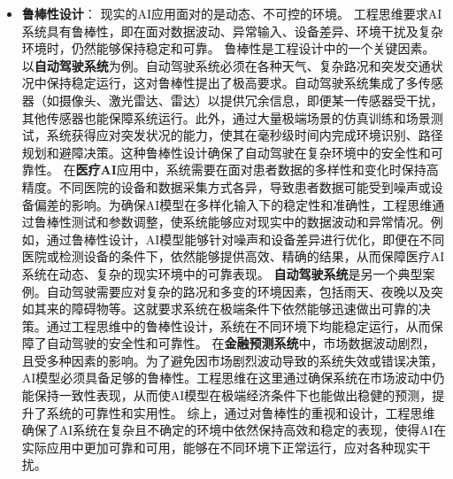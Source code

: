 \begin{itemize}
例如，
在{\bf 搜索引擎}中，算法需快速处理数十亿条网页数据，以秒级响应用户搜索请求。为了实现这一点，工程思维通过分布式计算、并行处理等技术，使算法能够在极短时间内完成大规模数据分析。
在{\bf 推荐系统}中，处理数百万用户和上亿个商品的海量数据是系统的常态。推荐系统需要在最短时间内生成个性化推荐结果，这不仅依赖于优化算法的设计，还需要使用分布式计算技术来支持大规模并行处理，将复杂任务拆解成小块，以应对海量数据处理。这不仅提升了系统的实时响应能力，还使得模型能够适应用户需求的动态变化。
在{\bf 图像分类}和{\bf 自然语言处理}任务中，处理大型图像数据集（如ImageNet）或长文本数据也面临相似的需求，单一计算节点的资源通常不足以应对这些任务。因此工程上通常采用分布式训练，将模型任务分配到多节点、多服务器环境下并行处理，以大幅提升系统的整体计算能力和响应效率。这种方法为图像处理、文本处理等大规模应用提供了计算基础，使得系统能够高效应对海量数据。
\item {\bf 鲁棒性设计}：
现实的AI应用面对的是动态、不可控的环境。
工程思维要求AI系统具有鲁棒性，即在面对数据波动、异常输入、设备差异、环境干扰及复杂环境时，仍然能够保持稳定和可靠。
鲁棒性是工程设计中的一个关键因素。
以{\bf 自动驾驶系统}为例。自动驾驶系统必须在各种天气、复杂路况和突发交通状况中保持稳定运行，这对鲁棒性提出了极高要求。自动驾驶系统集成了多传感器（如摄像头、激光雷达、雷达）以提供冗余信息，即便某一传感器受干扰，其他传感器也能保障系统运行。此外，通过大量极端场景的仿真训练和场景测试，系统获得应对突发状况的能力，使其在毫秒级时间内完成环境识别、路径规划和避障决策。这种鲁棒性设计确保了自动驾驶在复杂环境中的安全性和可靠性。
在{\bf 医疗AI}应用中，系统需要在面对患者数据的多样性和变化时保持高精度。不同医院的设备和数据采集方式各异，导致患者数据可能受到噪声或设备偏差的影响。为确保AI模型在多样化输入下的稳定性和准确性，工程思维通过鲁棒性测试和参数调整，使系统能够应对现实中的数据波动和异常情况。例如，通过鲁棒性设计，AI模型能够针对噪声和设备差异进行优化，即便在不同医院或检测设备的条件下，依然能够提供高效、精确的结果，从而保障医疗AI系统在动态、复杂的现实环境中的可靠表现。
{\bf 自动驾驶系统}是另一个典型案例。自动驾驶需要应对复杂的路况和多变的环境因素，包括雨天、夜晚以及突如其来的障碍物等。这就要求系统在极端条件下依然能够迅速做出可靠的决策。通过工程思维中的鲁棒性设计，系统在不同环境下均能稳定运行，从而保障了自动驾驶的安全性和可靠性。
在{\bf 金融预测系统}中，市场数据波动剧烈，且受多种因素的影响。为了避免因市场剧烈波动导致的系统失效或错误决策，AI模型必须具备足够的鲁棒性。工程思维在这里通过确保系统在市场波动中仍能保持一致性表现，从而使AI模型在极端经济条件下也能做出稳健的预测，提升了系统的可靠性和实用性。
综上，通过对鲁棒性的重视和设计，工程思维确保了AI系统在复杂且不确定的环境中依然保持高效和稳定的表现，使得AI在实际应用中更加可靠和可用，能够在不同环境下正常运行，应对各种现实干扰。

\end{itemize}
